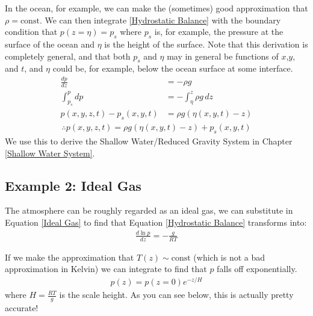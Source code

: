 In the ocean, for example, we can make the (sometimes) good approximation that $\rho=\text{const}$. We can then integrate \ref{Hydrostatic Balance} with the boundary condition that $p(z=\eta)=p_s$ where $p_s$ is, for example, the pressure at the surface of the ocean and $\eta$ is the height of the surface. Note that this derivation is completely general, and that both $p_s$ and $\eta$ may in general be functions of $x$,$y$, and $t$, and $\eta$ could be, for example, below the ocean surface at some interface.
\begin{align*}
    \frac{d p}{d z}&=-\rho g\\
    \int_{p_s}^{p}dp&=-\int_{\eta}^{z}\rho g \, dz\\
    p(x,y,z,t)-p_s(x,y,t)&=\rho g (\eta(x,y,t)-z)
\end{align*}
\begin{align}
    \therefore \boxed{p(x,y,z,t)=\rho g(\eta(x,y,t)-z)+p_s(x,y,t)}
\end{align}
We use this to derive the Shallow Water/Reduced Gravity System in Chapter \ref{Shallow Water System}.

\subsection{Example 2: Ideal Gas}\label{Example 2: Ideal Gas}

The atmosphere can be roughly regarded as an ideal gas, we can substitute in Equation \ref{Ideal Gas} to find that Equation \ref{Hydrostatic Balance} transforms into:
\begin{align}
    \label{Hydrostatic Balance Ideal}
    \boxed{\frac{d\ln p}{dz}=-\frac{g}{RT}}
\end{align}

If we make the approximation that $T(z)\sim\text{const}$ (which is not a bad approximation in Kelvin) we can integrate to find that $p$ falls off exponentially.
\begin{align*}
    p(z)=p(z=0)e^{-z/H}
\end{align*}
where $H=\frac{RT}{g}$ is the scale height. As you can see below, this is actually pretty accurate!

